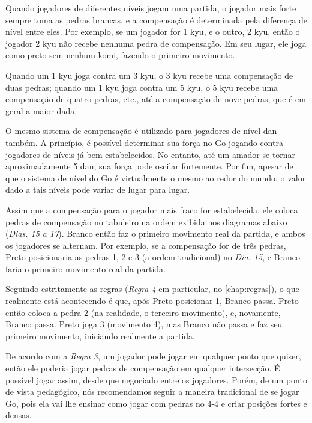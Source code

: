 Quando jogadores de diferentes níveis jogam uma partida, o jogador mais forte sempre toma as pedras brancas, e a compensação é determinada pela diferença de nível entre eles. Por exemplo, se um jogador for 1 kyu, e o outro, 2 kyu, então o jogador 2 kyu não recebe nenhuma pedra de compensação. Em seu lugar, ele joga como preto sem nenhum komi, fazendo o primeiro movimento.

Quando um 1 kyu joga contra um 3 kyu, o 3 kyu recebe uma compensação de duas pedras; quando um 1 kyu joga contra um 5 kyu, o 5 kyu recebe uma compensação de quatro pedras, etc., até a compensação de nove pedras, que é em geral a maior dada.

O mesmo sistema de compensação é utilizado para jogadores de nível dan também. A princípio, é possível determinar sua força no Go jogando contra jogadores de níveis já bem estabelecidos. No entanto, até um amador se tornar aproximadamente 5 dan, sua força pode oscilar fortemente. Por fim, apesar de que o sistema de nível do Go é virtualmente o mesmo ao redor do mundo, o valor dado a tais níveis pode variar de lugar para lugar.

Assim que a compensação para o jogador mais fraco for estabelecida, ele coloca pedras de compensação no tabuleiro na ordem exibida nos diagramas abaixo (\emph{Dias. 15 a 17}). Branco então faz o primeiro movimento real da partida, e ambos os jogadores se alternam. Por exemplo, se a compensação for de três pedras, Preto posicionaria as pedras 1, 2 e 3 (a ordem tradicional) no \emph{Dia. 15}, e Branco faria o primeiro movimento real da partida.

Seguindo estritamente as regras (\emph{Regra 4} em particular, no \autoref{chap:regras}), o que realmente está acontecendo é que, após Preto posicionar 1, Branco passa. Preto então coloca a pedra 2 (na realidade, o terceiro movimento), e, novamente, Branco passa. Preto joga 3 (movimento 4), mas Branco não passa e faz seu primeiro movimento, iniciando realmente a partida.

De acordo com a \emph{Regra 3}, um jogador pode jogar em qualquer ponto que quiser, então ele poderia jogar pedras de compensação em qualquer intersecção. É possível jogar assim, desde que negociado entre os jogadores. Porém, de um ponto de vista pedagógico, nós recomendamos seguir a maneira tradicional de se jogar Go, pois ela vai lhe ensinar como jogar com pedras no 4-4 e criar posições fortes e densas.